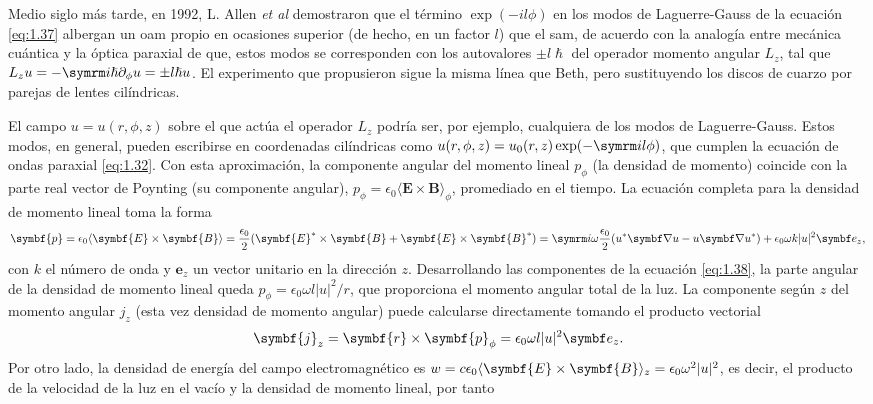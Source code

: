 Medio siglo más tarde, en 1992, L. Allen \emph{et al} demostraron \autocite{Allen1992} que el término $\exp(-il \phi)$ en los modos de Laguerre-Gauss de la ecuación \eqref{eq:1.37} albergan un \acrshort{oam} propio en ocasiones superior (de hecho, en un factor $l$) que el \acrshort{sam}, de acuerdo con la analogía entre mecánica cuántica y la óptica paraxial \autocite{Born2019} de que, estos modos se corresponden con los autovalores $\pm l \hslash $ del operador momento angular $L_{z}$, tal que $L_{z}u= -\iu \hslash \pdiff_{\phi}u=\pm l \hslash u$. El experimento que propusieron sigue la misma línea que Beth, pero sustituyendo los discos de cuarzo por parejas de lentes cilíndricas.

El campo $u=u(r,\phi,z)$ sobre el que actúa el operador $L_{z}$ podría ser, por ejemplo, cualquiera de los modos de Laguerre-Gauss. Estos modos, en general, pueden escribirse en coordenadas cilíndricas como $u(r,\phi,z) = u_{0}(r,z)\exp(-\iu l \phi)$, que cumplen la ecuación de ondas paraxial \eqref{eq:1.32}. Con esta aproximación, la componente angular del momento lineal $p_{\phi}$ (la densidad de momento) coincide con la parte real vector de Poynting (su componente angular), $p_{\phi} = \epsilon_{0}\langle\symbf{E}\times \symbf{B}\rangle_{\phi}$, promediado en el tiempo. La ecuación completa para la densidad de momento lineal toma la forma
\begin{equation}\label{eq:1.38}
  \symbf{p} = \epsilon_{0}\langle\symbf{E}\times \symbf{B}\rangle = \frac{\epsilon_{0}}{2}(\symbf{E}^{*}\times \symbf{B} + \symbf{E}\times \symbf{B}^{*}) = \iu \omega \frac{\epsilon_{0}}{2} (u^{*}\grad u - u \grad u^{*}) + \epsilon_{0} \omega k |u|^{2}\unitvector_{z},
\end{equation}
con $k$ el número de onda y $\symbf{e}_{z}$ un vector unitario en la dirección $z$. Desarrollando las componentes de la ecuación \eqref{eq:1.38}, la parte angular de la densidad de momento lineal queda $p_{\phi}=\epsilon_{0} \omega l |u|^{2}/r$, que proporciona el momento angular total de la luz. La componente según $z$ del momento angular $j_{z}$ (esta vez densidad de momento angular) puede calcularse directamente tomando el producto vectorial
\begin{equation}\label{eq:1.39}
  \symbf{j}_{z} = \symbf{r}\times \symbf{p}_{\phi} = \epsilon_{0} \omega l |u|^{2}\unitvector_{z}.
\end{equation}
Por otro lado, la densidad de energía del campo electromagnético es $w = c \epsilon_{0}\xval{\symbf{E}\times \symbf{B}}_{z} = \epsilon_{0} \omega^{2} |u|^{2}$, es decir, el producto de la velocidad de la luz en el vacío y la densidad de momento lineal, por tanto

